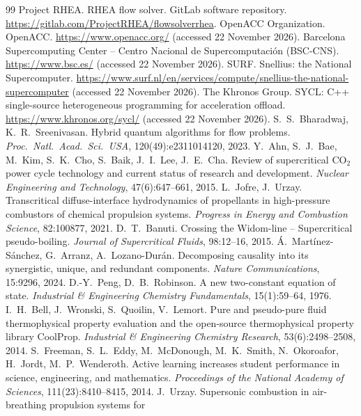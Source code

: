 \documentclass[11pt]{article}
\begin{document}
\begin{thebibliography}{99}
 Project RHEA. RHEA flow solver. GitLab software repository. \url{https://gitlab.com/ProjectRHEA/flowsolverrhea}.
 OpenACC Organization. OpenACC. \url{https://www.openacc.org/} (accessed 22 November 2026).
 Barcelona Supercomputing Center -- Centro Nacional de Supercomputaci\'on (BSC-CNS). \url{https://www.bsc.es/} (accessed 22 November 2026).
 SURF. Snellius: the National Supercomputer. \url{https://www.surf.nl/en/services/compute/snellius-the-national-supercomputer} (accessed 22 November 2026).
 The Khronos Group. SYCL: C++ single-source heterogeneous programming for acceleration offload. \url{https://www.khronos.org/sycl/} (accessed 22 November 2026).
 S.\ S.\ Bharadwaj, K.\ R.\ Sreenivasan. Hybrid quantum algorithms for flow problems. \emph{Proc.\ Natl.\ Acad.\ Sci.\ USA}, 120(49):e2311014120, 2023.
 Y.\ Ahn, S.\ J.\ Bae, M.\ Kim, S.\ K.\ Cho, S.\ Baik, J.\ I.\ Lee, J.\ E.\ Cha.
Review of supercritical CO$_2$ power cycle technology and current status of research and
development. \emph{Nuclear Engineering and Technology}, 47(6):647--661, 2015.
 L.\ Jofre, J.\ Urzay. Transcritical diffuse-interface hydrodynamics
of propellants in high-pressure combustors of chemical propulsion systems. \emph{Progress
in Energy and Combustion Science}, 82:100877, 2021.
 D.\ T.\ Banuti. Crossing the Widom-line -- Supercritical pseudo-boiling.
\emph{Journal of Supercritical Fluids}, 98:12--16, 2015.
 \'A.\ Mart\'inez-S\'anchez, G.\ Arranz, A.\ Lozano-Dur\'an.
Decomposing causality into its synergistic, unique, and redundant components. \emph{Nature
Communications}, 15:9296, 2024.
 D.-Y.\ Peng, D.\ B.\ Robinson. A new two-constant equation of
state. \emph{Industrial \& Engineering Chemistry Fundamentals}, 15(1):59--64, 1976.
 I.\ H.\ Bell, J.\ Wronski, S.\ Quoilin, V.\ Lemort. Pure and
pseudo-pure fluid thermophysical property evaluation and the open-source thermophysical
property library CoolProp. \emph{Industrial \& Engineering Chemistry Research},
53(6):2498--2508, 2014.
 S.\ Freeman, S.\ L.\ Eddy, M.\ McDonough, M.\ K.\ Smith, N.\ Okoroafor,
H.\ Jordt, M.\ P.\ Wenderoth. Active learning increases student performance in science,
engineering, and mathematics. \emph{Proceedings of the National Academy of Sciences},
111(23):8410--8415, 2014.
 J.\ Urzay. Supersonic combustion in air-breathing propulsion systems for

\end{thebibliography}
\end{document}

